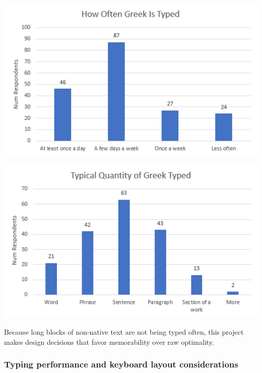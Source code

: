 \documentclass[11pt]{article}
\begin{document}
\begin{center}
\includegraphics[width=.9\linewidth]{./images/typing-frequency.PNG}
\end{center}

\begin{center}
\includegraphics[width=.9\linewidth]{./images/typing-quantity.PNG}
\end{center}

Because long blocks of non-native text are not being typed often, this project makes design decisions that favor memorability over raw optimality.

\subsubsection{Typing performance and keyboard layout considerations}
\label{sec:org02f3267}
\end{document}
